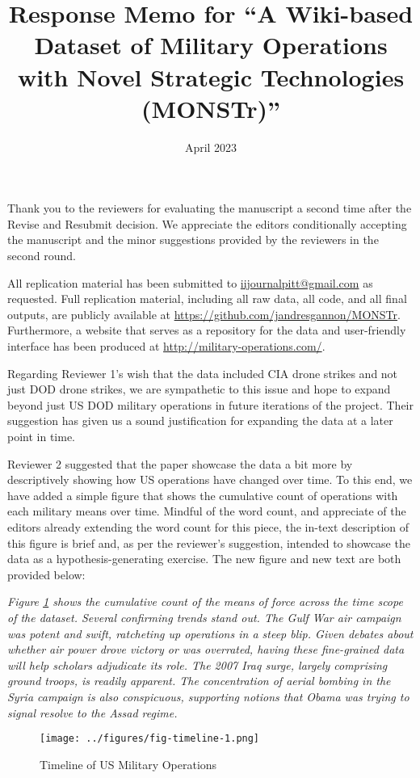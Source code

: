 \documentclass[fleqn,12pt]{article}
\title{Response Memo for ``A Wiki-based Dataset of Military Operations with Novel Strategic Technologies (MONSTr)''}
\date{April 2023}
\begin{document}
\thispagestyle{empty}
\setcounter{page}{0}

\maketitle

Thank you to the reviewers for evaluating the manuscript a second time after the Revise and Resubmit decision. We appreciate the editors conditionally accepting the manuscript and the minor suggestions provided by the reviewers in the second round.

All replication material has been submitted to \url{iijournalpitt@gmail.com} as requested. Full replication material, including all raw data, all code, and all final outputs, are publicly available at \url{https://github.com/jandresgannon/MONSTr}. Furthermore, a website that serves as a repository for the data and user-friendly interface has been produced at \url{http://military-operations.com/}.

Regarding Reviewer 1's wish that the data included CIA drone strikes and not just DOD drone strikes, we are sympathetic to this issue and hope to expand beyond just US DOD military operations in future iterations of the project. Their suggestion has given us a sound justification for expanding the data at a later point in time.

Reviewer 2 suggested that the paper showcase the data a bit more by descriptively showing how US operations have changed over time. To this end, we have added a simple figure that shows the cumulative count of operations with each military means over time. Mindful of the word count, and appreciate of the editors already extending the word count for this piece, the in-text description of this figure is brief and, as per the reviewer's suggestion, intended to showcase the data as a hypothesis-generating exercise. The new figure and new text are both provided below:

\newpage

\textit{Figure \ref{fig:fig-timeline-1} shows the cumulative count of the means of force across the time scope of the dataset. Several confirming trends stand out. The Gulf War air campaign was potent and swift, ratcheting up operations in a steep blip. Given debates about whether air power drove victory or was overrated, having these fine-grained data will help scholars adjudicate its role. The 2007 Iraq surge, largely comprising ground troops, is readily apparent. The concentration of aerial bombing in the Syria campaign is also conspicuous, supporting notions that Obama was trying to signal resolve to the Assad regime.}

\begin{figure}[h]
	\begin{center}
		\caption{Timeline of US Military Operations}
		{\texttt{[image: ../figures/fig-timeline-1.png]}}
		\label{fig:fig-timeline-1}
		\vspace{0.1 in}
	\end{center}
\end{figure}
\end{document}
